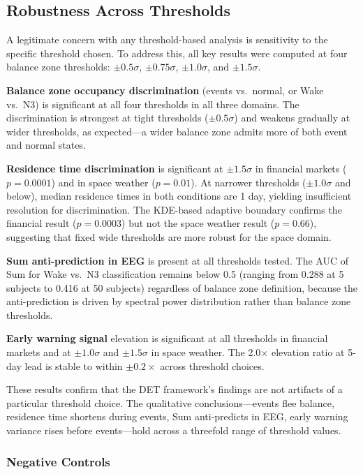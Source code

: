 \documentclass[aip,cha,reprint,amsmath,amssymb]{revtex4-2}
\begin{document}
\subsection{\label{sec:robustness}Robustness Across Thresholds}

A legitimate concern with any threshold-based analysis is sensitivity to the specific threshold chosen. To address this, all key results were computed at four balance zone thresholds: $\pm 0.5\sigma$, $\pm 0.75\sigma$, $\pm 1.0\sigma$, and $\pm 1.5\sigma$.

\textbf{Balance zone occupancy discrimination} (events vs.\ normal, or Wake vs.\ N3) is significant at all four thresholds in all three domains. The discrimination is strongest at tight thresholds ($\pm 0.5\sigma$) and weakens gradually at wider thresholds, as expected---a wider balance zone admits more of both event and normal states.

\textbf{Residence time discrimination} is significant at $\pm 1.5\sigma$ in financial markets ($p = 0.0001$) and in space weather ($p = 0.01$). At narrower thresholds ($\pm 1.0\sigma$ and below), median residence times in both conditions are 1 day, yielding insufficient resolution for discrimination. The KDE-based adaptive boundary confirms the financial result ($p = 0.0003$) but not the space weather result ($p = 0.66$), suggesting that fixed wide thresholds are more robust for the space domain.

\textbf{Sum anti-prediction in EEG} is present at all thresholds tested. The AUC of Sum for Wake vs.\ N3 classification remains below 0.5 (ranging from 0.288 at 5 subjects to 0.416 at 50 subjects) regardless of balance zone definition, because the anti-prediction is driven by spectral power distribution rather than balance zone thresholds.

\textbf{Early warning signal} elevation is significant at all thresholds in financial markets and at $\pm 1.0\sigma$ and $\pm 1.5\sigma$ in space weather. The 2.0$\times$ elevation ratio at 5-day lead is stable to within $\pm 0.2\times$ across threshold choices.

These results confirm that the DET framework's findings are not artifacts of a particular threshold choice. The qualitative conclusions---events flee balance, residence time shortens during events, Sum anti-predicts in EEG, early warning variance rises before events---hold across a threefold range of threshold values.

\subsubsection{Negative Controls}
\end{document}
